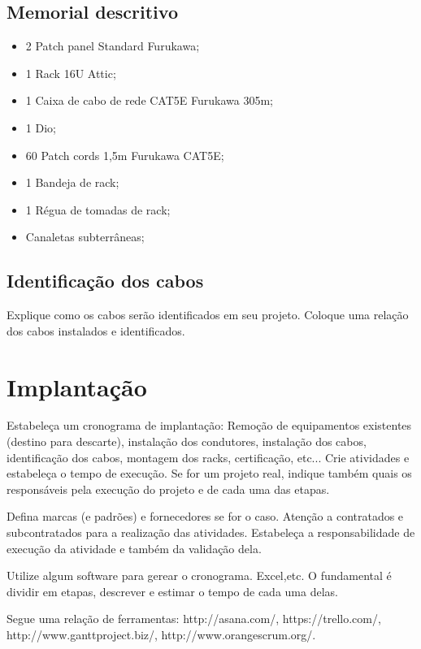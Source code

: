 \documentclass[	DIV=calc,%
							paper=a4,%
							fontsize=12pt,%
							onecolumn]{scrartcl}	 					%
\begin{document}
	

\subsection{Memorial descritivo}

\begin{itemize}
	\item 2 Patch panel Standard Furukawa;
	\item 1 Rack 16U Attic;
 	\item 1 Caixa de cabo de rede CAT5E Furukawa 305m;
 	\item 1 Dio;
 	\item 60 Patch cords 1,5m Furukawa CAT5E;
 	\item 1 Bandeja de rack;
 	\item 1 Régua de tomadas de rack;
 	\item Canaletas subterrâneas;
  	 
\end{itemize}

\subsection{Identificação dos cabos}
Explique como os cabos serão identificados em seu projeto. Coloque uma relação dos cabos instalados e identificados.

\section{Implantação}
Estabeleça um cronograma de implantação:
Remoção de equipamentos existentes (destino para descarte), instalação dos condutores, instalação dos cabos, 
identificação dos cabos, montagem dos racks, certificação, etc... Crie atividades e estabeleça o tempo de execução. Se for um projeto real, indique também quais os responsáveis pela execução do projeto e de cada uma das etapas.

Defina marcas (e padrões) e fornecedores se for o caso. Atenção a contratados e subcontratados para a realização das atividades. Estabeleça a responsabilidade de execução da atividade e também da validação dela.

Utilize algum software para gerear o cronograma. Excel,etc. O fundamental é dividir em etapas, descrever e estimar o tempo de cada uma delas.

Segue uma relação de ferramentas:
http://asana.com/, 
https://trello.com/, 
http://www.ganttproject.biz/, 
http://www.orangescrum.org/. 
\end{document}
